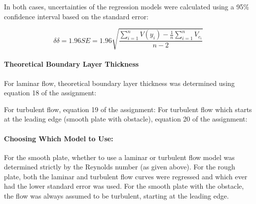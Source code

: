 \documentclass[12pt]{article}
\begin{document}
	\hfill\break\break
	In both cases, uncertainties of the regression models were calculated using a 95\% confidence interval based on the standard error:
	
	\begin{equation}
	\delta \delta = 1.96SE = 1.96\sqrt{\frac{\sum_{i=1}^{n}{V(y_i) - \frac{1}{n}\sum_{i=1}^{n}{V_{c_i}}}}{n-2}}
	\end{equation}
	
	
	\paragraph{Theoretical Boundary Layer Thickness}
	For laminar flow, theoretical boundary layer thickness was determined using equation 18 of the assignment:
	
	\hfill\break
	For turbulent flow, equation 19 of the assignment:
	\hfill\break\break
	For turbulent flow which starts at the leading edge (smooth plate with obstacle), equation 20 of the assignment:
	
	\paragraph{Choosing Which Model to Use:} For the smooth plate, whether to use a laminar or turbulent flow model was determined strictly by the Reynolds number (as given above). For the rough plate, both the laminar and turbulent flow curves were regressed and which ever had the lower standard error was used. For the smooth plate with the obstacle, the flow was always assumed to be turbulent, starting at the leading edge.
	
	
\end{document}

